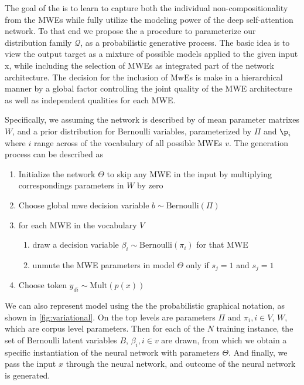 The goal of the \BertMWE is to learn to capture both the individual non-compositionality from the MWEs while fully utilize the modeling power of the deep self-attention network. To that end we propose the a procedure to parameterize our distribution family $\mathcal{Q}$, 
as a probabilistic generative process. 
The basic idea is to view the output target as a mixture of possible models applied to the given input x, 
while including the selection of MWEs as integrated part of the network architecture.
The decision for the inclusion of MwEs is make in a hierarchical manner by a global factor controlling the joint quality of the MWE architecture as well as independent qualities for each MWE.

Specifically, we assuming the network is described by of mean parameter matrixes $W$, and a prior distribution for Bernoulli variables, parameterized by $\Pi$ and $\p_i$ where $i$ range across of the vocabulary of all possible MWEs $v$. The generation process can be described as
\begin{enumerate}
    \item Initialize the network $\Theta$ to skip any MWE in the input by multiplying correspondings parameters in $W$ by zero
    \item Choose global mwe decision variable 
        $b \sim \mbox{Bernoulli}(\Pi)$
    \item{for each MWE in the vocabulary $V$}
    \begin{enumerate}
        \item draw a decision variable $\beta_i \sim \mbox{Bernoulli}(\pi_i)$ for that MWE 
        \item{unmute the MWE parameters in model $\Theta$ only if $s_{j}=1$ and $s_{j}=1$}
    \end{enumerate}
    \item{Choose token $y_{di} \sim \mbox{Mult}(p(x))$}
\end{enumerate}


We can also represent \BertMWE model using the the probabilistic graphical notation, as shown in \autoref{fig:variational}. 
On the top levels are parameters $\Pi$ and $\pi_i, i \in V$, $W$, which are corpus level parameters. Then for each of the $N$ training instance, the set of Bernoulli latent variables
$B$, $\beta_i, i\in v$ are drawn, from which we obtain a specific instantiation of the neural network with parameters $\Theta$. And finally, we pass the input $x$ through the neural network, and outcome of the neural network is generated.


